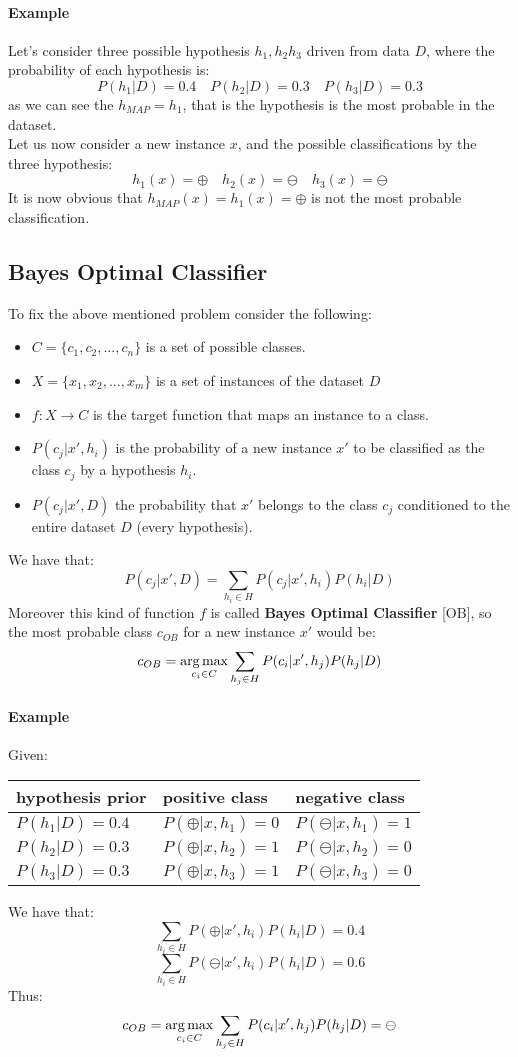 \paragraph{Example}
Let's consider three possible hypothesis $h_1,h_2h_3$ driven from data $D$, where the probability of each hypothesis is:
\[P(h_1|D)=0.4\quad P(h_2|D)=0.3\quad P(h_3|D)=0.3\]
as we can see the $h_{MAP}=h_1$, that is the hypothesis is the most probable in the dataset.\\
Let us now consider a new instance $x$, and the possible classifications by the three hypothesis:
\[h_1(x)=\oplus \quad h_2(x)=\ominus \quad h_3(x)=\ominus \]
It is now obvious that $h_{MAP}(x)=h_1(x)=\oplus$ is not the most probable classification.

\subsection{Bayes Optimal Classifier}
To fix the above mentioned problem consider the following:
\begin{itemize}
\item $C=\lbrace c_1,c_2,...,c_n\rbrace$ is a set of possible classes.
\item $X=\lbrace x_1,x_2,...,x_m\rbrace$ is a set of instances of the dataset $D$
\item $f: X \rightarrow C$ is the target function that maps an instance to a class.
\item $P(c_j|x',h_i)$ is the probability of a new instance $x'$ to  be classified as the class $c_j$ by a hypothesis $h_i$.
\item $P(c_j| x',D)$ the probability that $x'$ belongs to the class $c_j$ conditioned to the entire dataset $D$ (every hypothesis).
\end{itemize}
We have that:
\[P(c_j| x',D)= \sum_{h_i \in H} P(c_j|x',h_i)P(h_i|D)\]
Moreover this kind of function $f$ is called \textbf{Bayes Optimal Classifier} [OB], so the most probable class $c_{OB}$ for a new instance $x'$ would be:
\[c_{OB}=\operatorname*{arg\,max}_{c_i \in C}\sum_{h_j \in H}P(c_i|x',h_j)P(h_j|D)\]

\paragraph{Example}
Given:
\begin{table}[H]
    \begin{tabular}{|l|l|l|}
        \hline
        hypothesis prior & positive class    & negative class     \\ \hline
        $P(h_1|D)=0.4 $    &  $P(\oplus|x,h_1)=0$ &$ P(\ominus|x,h_1)=1$ \\ 
        $P(h_2|D)=0.3  $   & $P(\oplus|x,h_2)=1$ & $P(\ominus|x,h_2)=0$ \\ 
        $P(h_3|D)=0.3$     &$P(\oplus|x,h_3)=1 $& $P(\ominus|x,h_3)=0 $\\
        \hline
    \end{tabular}
\end{table}
We have that:
\[\sum_{h_i \in H} P(\oplus|x',h_i)P(h_i|D)=0.4\]
\[\sum_{h_i \in H} P(\ominus|x',h_i)P(h_i|D)=0.6\]
Thus:
\[c_{OB}=\operatorname*{arg\,max}_{c_i \in C}\sum_{h_j \in H}P(c_i|x',h_j)P(h_j|D)=\ominus\]

